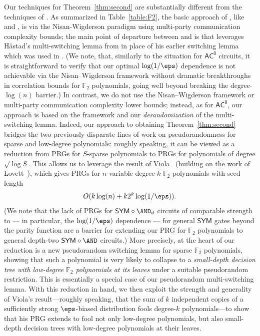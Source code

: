 \documentclass[11pt]{article}
\numberwithin{equation}{section}
\theoremstyle{definition}
\theoremstyle{plain}
\theoremstyle{plain}
\newcommand{\acz}{\mathsf{AC^0}}
\newcommand{\SYM}{\mathsf{SYM}}
\renewcommand{\F}{\mathds{F}}
\begin{document}
Our techniques for Theorem~\ref{thm:second} are substantially different from the techniques of \cite{ST18,Vio06}.  As summarized in Table~\ref{table:F2}, the basic approach of \cite{ST18}, like \cite{Vio06} and \cite{LVW93}, is via the Nisan-Wigderson paradigm using multi-party communication complexity bounds; the main point of departure 
between \cite{ST18} and \cite{Vio06} is that \cite{ST18} leverages
H{\aa}stad's multi-switching lemma from \cite{Has14} in place of his earlier \cite{Hastad86} switching lemma which was used in \cite{Vio06}.  (We note, that, %
similarly  %
to the situation for $\acz$ circuits, it is straightforward to verify that our optimal $\log(1/\eps)$ dependence is not achievable via the Nisan--Wigderson framework without dramatic breakthroughs in correlation bounds for $\F_2$ polynomials, going well beyond breaking the degree-$\log(n)$ %
barrier.) In contrast, we do not use the Nisan--Wigderson framework or multi-party communication complexity lower bounds; instead, as for $\acz$, our approach is based on the \cite{AjtaiWigderson:85} framework and our \emph{derandomization} of the \cite{Has14} multi-switching lemma.  Indeed, our approach to obtaining Theorem~\ref{thm:second} bridges the two previously disparate lines of work on pseudorandomness for sparse and low-degree %
polynomials: roughly speaking, it can be viewed as a reduction from PRGs for $S$-sparse polynomials to PRGs for
%
polynomials of degree $\sqrt{\log S}$.  %
This allows us to leverage the result of Viola~\cite{Vio09} (building on the work of Lovett~\cite{Lov09}), which gives PRGs for $n$-variable degree-$k$ $\F_2$ polynomials with seed length 
\[ O(k\log(n) + k2^{k}\log(1/\eps)). \] 
(We note that the lack of PRGs  for $\SYM \circ \AND_d$ circuits of comparable strength to \cite{Vio09,Lov09} --- in particular, the $\log(1/\eps)$ dependence --- for general $\SYM$ gates beyond the parity function are a barrier for extending our PRG for $\F_2$ polynomials to general depth-two $\SYM \circ \AND$ circuits.) More precisely, at the heart of our reduction is a new pseudorandom switching lemma for sparse $\F_2$ polynomials, showing that such a polynomial is very likely to collapse to a \emph{small-depth decision tree with low-degree $\F_2$ polynomials at its leaves} under a suitable pseudorandom restriction.  This is essentially a special case of our pseudorandom multi-switching lemma.  With this reduction in hand, we then exploit the strength and generality of Viola's result---roughly speaking, that the sum of $k$ independent copies of a sufficiently strong $\eps$-biased distribution fools degree-$k$ polynomials---to show that his PRG extends to fool not only low-degree polynomials, but also small-depth decision trees with low-degree polynomials at their leaves. 
\end{document}
